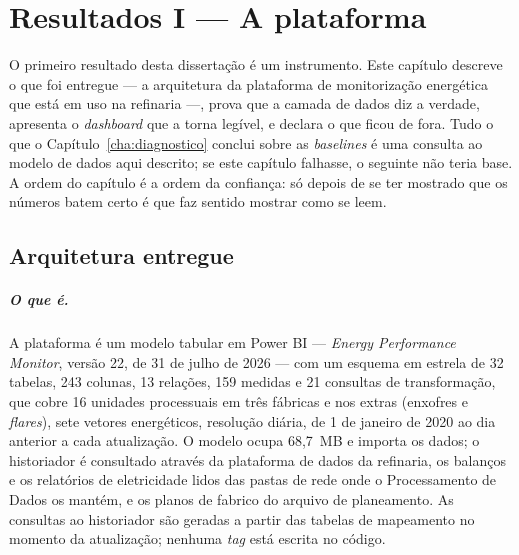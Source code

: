 
\chapter{Resultados I --- A plataforma}
\label{cha:plataforma}

O primeiro resultado desta dissertação é um instrumento. Este capítulo
descreve o que foi entregue --- a arquitetura da plataforma de
monitorização energética que está em uso na refinaria ---, prova que a
camada de dados diz a verdade, apresenta o \emph{dashboard} que a torna
legível, e declara o que ficou de fora. Tudo o que o
Capítulo~\ref{cha:diagnostico} conclui sobre as \emph{baselines} é uma
consulta ao modelo de dados aqui descrito; se este capítulo falhasse, o
seguinte não teria base. A ordem do capítulo é a ordem da confiança: só
depois de se ter mostrado que os números batem certo é que faz sentido
mostrar como se leem.

\section{Arquitetura entregue}
\label{sec:arquitetura}

\paragraph{O que é.} A plataforma é um modelo tabular em Power BI ---
\emph{Energy Performance Monitor}, versão 22, de 31 de julho de 2026 ---
com um esquema em estrela de 32 tabelas, 243 colunas, 13 relações, 159
medidas e 21 consultas de transformação, que cobre 16 unidades processuais
em três fábricas e nos extras (enxofres e \emph{flares}), sete vetores
energéticos, resolução diária, de 1 de janeiro de 2020 ao dia anterior a
cada atualização. O modelo ocupa 68,7~MB e importa os dados; o historiador
é consultado através da plataforma de dados da refinaria, os balanços e os
relatórios de eletricidade lidos das pastas de rede onde o Processamento de
Dados os mantém, e os planos de fabrico do arquivo de planeamento. As
consultas ao historiador são geradas a partir das tabelas de mapeamento
no momento da atualização; nenhuma \emph{tag} está escrita no código.

